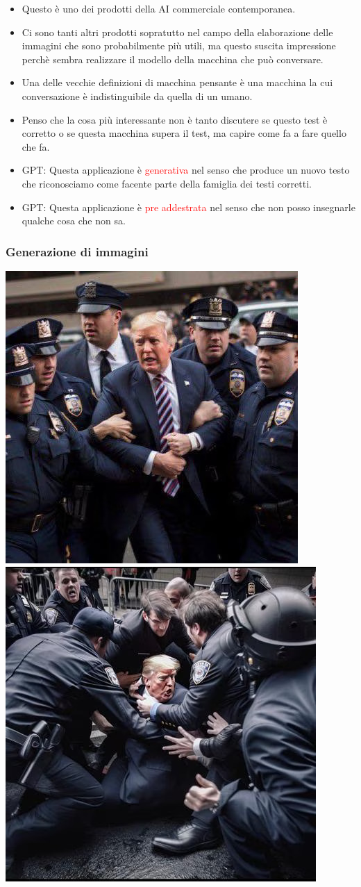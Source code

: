 \documentclass[xcolor=svgnames]{beamer}
\newcommand{\rosso}[1]{\textcolor{red}{#1}}
\renewcommand{\emph}{\rosso}
\begin{document}
\begin{frame}
\newpage 

\begin{itemize}
    \item Questo è uno dei prodotti della 
    AI commerciale contemporanea.

    \item Ci sono tanti altri prodotti sopratutto nel campo della elaborazione delle immagini che sono probabilmente più utili, ma questo suscita impressione perchè sembra realizzare il modello della macchina che può conversare.

    \item Una delle vecchie definizioni di macchina pensante è una macchina la cui conversazione è indistinguibile da quella di un umano.

\item Penso che la cosa più interessante non è tanto discutere se questo test è corretto o se questa macchina supera il test, ma capire come fa a fare quello che fa.

\item GPT: Questa applicazione è \emph{generativa} nel senso che produce un nuovo testo che riconosciamo come facente parte della famiglia dei testi corretti.
\item GPT: Questa applicazione è \emph{pre addestrata} nel senso che non posso insegnarle qualche cosa che non sa.

\end{itemize}

\end{frame}

\begin{frame}[plain]\small\frametitle{Generazione di immagini}
  \includegraphics[width=.4\textwidth]{pictures/trump-1.jpg}  \hfill 
   \includegraphics[width=.4\textwidth]{pictures/trump-2.jpg}  
\end{frame}
\end{document}
